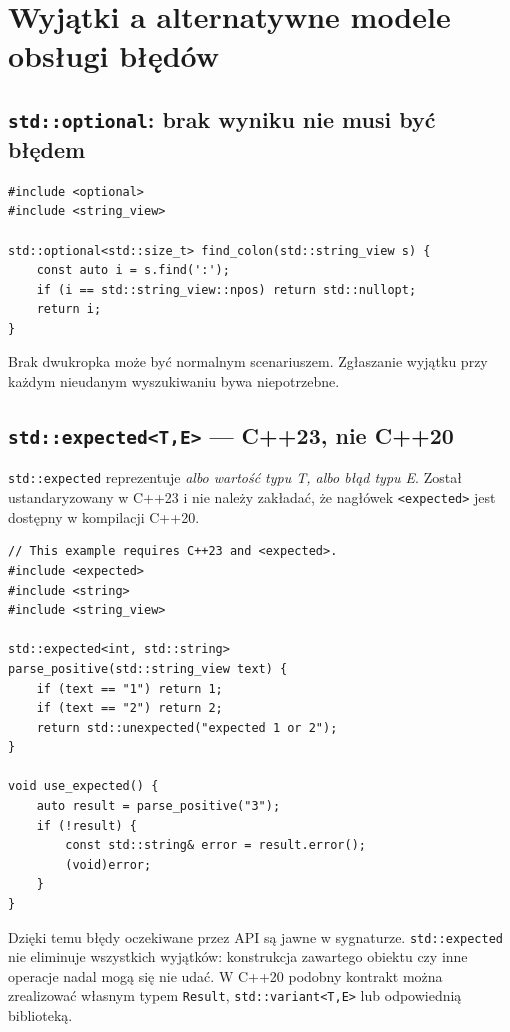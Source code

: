 \section{Wyjątki a alternatywne modele obsługi błędów}
\label{sec:cpp11-alternatives}

\subsection{\texttt{std::optional}: brak wyniku nie musi być błędem}

\begin{lstlisting}
#include <optional>
#include <string_view>

std::optional<std::size_t> find_colon(std::string_view s) {
    const auto i = s.find(':');
    if (i == std::string_view::npos) return std::nullopt;
    return i;
}
\end{lstlisting}

Brak dwukropka może być normalnym scenariuszem. Zgłaszanie wyjątku
przy każdym nieudanym wyszukiwaniu bywa niepotrzebne.

\subsection{\texttt{std::expected<T,E>} — C++23, nie C++20}

\texttt{std::expected} reprezentuje \emph{albo wartość typu T, albo
błąd typu E}. Został ustandaryzowany w C++23 i nie należy zakładać,
że nagłówek \texttt{<expected>} jest dostępny w kompilacji C++20.

\begin{lstlisting}
// This example requires C++23 and <expected>.
#include <expected>
#include <string>
#include <string_view>

std::expected<int, std::string>
parse_positive(std::string_view text) {
    if (text == "1") return 1;
    if (text == "2") return 2;
    return std::unexpected("expected 1 or 2");
}

void use_expected() {
    auto result = parse_positive("3");
    if (!result) {
        const std::string& error = result.error();
        (void)error;
    }
}
\end{lstlisting}

Dzięki temu błędy oczekiwane przez API są jawne w sygnaturze.
\texttt{std::expected} nie eliminuje wszystkich wyjątków: konstrukcja
zawartego obiektu czy inne operacje nadal mogą się nie udać.
W C++20 podobny kontrakt można zrealizować własnym typem
\texttt{Result}, \texttt{std::variant<T,E>} lub odpowiednią biblioteką.

